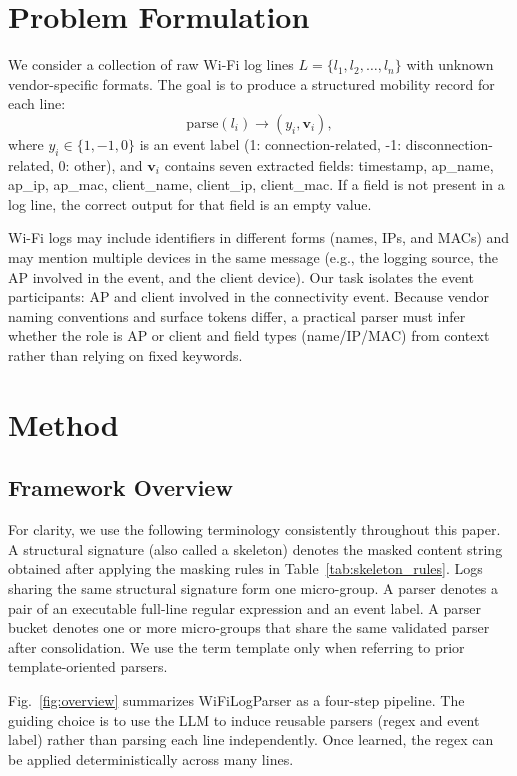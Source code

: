 \documentclass[journal]{IEEEtran}
\begin{document}
\section{Problem Formulation}
We consider a collection of raw Wi-Fi log lines $L = \{l_1, l_2, \ldots, l_n\}$ with unknown vendor-specific formats. The goal is to produce a structured mobility record for each line:
\begin{equation}
	\mathrm{parse}(l_i) \rightarrow (y_i, \mathbf{v}_i),
\end{equation}
where $y_i \in \{1, -1, 0\}$ is an event label (1: connection-related, -1: disconnection-related, 0: other), and $\mathbf{v}_i$ contains seven extracted fields:
{timestamp, ap\_name, ap\_ip, ap\_mac, client\_name, client\_ip, client\_mac}.
If a field is not present in a log line, the correct output for that field is an empty value.

Wi-Fi logs may include identifiers in different forms (names, IPs, and MACs) and may mention multiple devices in the same message (e.g., the logging source, the AP involved in the event, and the client device). Our task isolates the event participants: AP and client involved in the connectivity event. Because vendor naming conventions and surface tokens differ, a practical parser must infer whether the role is AP or client and field types (name/IP/MAC) from context rather than relying on fixed keywords.

\section{Method}
\subsection{Framework Overview}

For clarity, we use the following terminology consistently throughout this paper. A structural signature (also called a skeleton) denotes the masked content string obtained after applying the masking rules in Table~\ref{tab:skeleton_rules}. Logs sharing the same structural signature form one micro-group. A parser denotes a pair of an executable full-line regular expression and an event label. A parser bucket denotes one or more micro-groups that share the same validated parser after consolidation. We use the term template only when referring to prior template-oriented parsers.

Fig.~\ref{fig:overview} summarizes WiFiLogParser as a four-step pipeline. The guiding choice is to use the LLM to induce reusable parsers (regex and event label) rather than parsing each line independently. Once learned, the regex can be applied deterministically across many lines.
\end{document}
